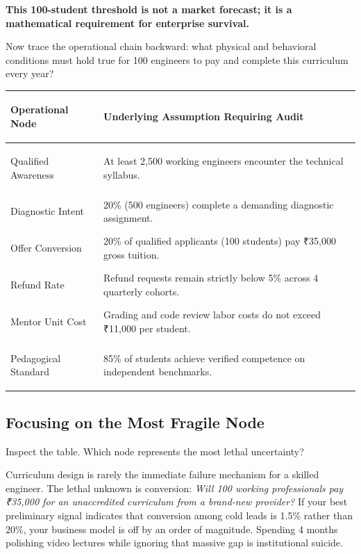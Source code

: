 \textbf{This 100-student threshold is not a market forecast; it is a mathematical requirement for enterprise survival.}

Now trace the operational chain backward: what physical and behavioral conditions must hold true for 100 engineers to pay and complete this curriculum every year?

\begin{tcolorbox}[
  enhanced,
  colback=BayesSurface!60,
  colframe=BayesBorder,
  boxrule=0.5pt,
  arc=3pt,
  left=3pt,right=3pt,top=3pt,bottom=3pt,
  boxsep=1pt
]
\scriptsize
\begin{tabularx}{\linewidth}{>{\bfseries\raggedright\arraybackslash}p{2.4cm} X}
\toprule
\textbf{Operational Node} & \textbf{Underlying Assumption Requiring Audit} \\
\midrule
Qualified Awareness & At least 2,500 working engineers encounter the technical syllabus. \\
\addlinespace[2pt]
Diagnostic Intent & 20\% (500 engineers) complete a demanding diagnostic assignment. \\
\addlinespace[2pt]
Offer Conversion & 20\% of qualified applicants (100 students) pay ₹35,000 gross tuition. \\
\addlinespace[2pt]
Refund Rate & Refund requests remain strictly below 5\% across 4 quarterly cohorts. \\
\addlinespace[2pt]
Mentor Unit Cost & Grading and code review labor costs do not exceed ₹11,000 per student. \\
\addlinespace[2pt]
Pedagogical Standard & 85\% of students achieve verified competence on independent benchmarks. \\
\bottomrule
\end{tabularx}
\end{tcolorbox}

\subsection{Focusing on the Most Fragile Node}

Inspect the table. Which node represents the most lethal uncertainty?

Curriculum design is rarely the immediate failure mechanism for a skilled engineer. The lethal unknown is conversion: \textit{Will 100 working professionals pay ₹35,000 for an unaccredited curriculum from a brand-new provider?} If your best preliminary signal indicates that conversion among cold leads is 1.5\% rather than 20\%, your business model is off by an order of magnitude. Spending 4 months polishing video lectures while ignoring that massive gap is institutional suicide.

